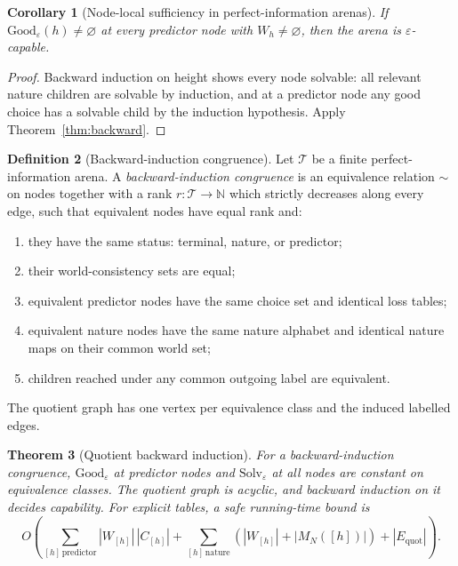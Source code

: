 \documentclass[11pt]{article}
\theoremstyle{plain}
\newtheorem{theorem}{Theorem}[section]
\newtheorem{corollary}[theorem]{Corollary}
\theoremstyle{definition}
\newtheorem{definition}[theorem]{Definition}
\theoremstyle{remark}
\newcommand{\N}{\mathbb{N}}
\newcommand{\eps}{\varepsilon}
\begin{document}
\begin{corollary}[Node-local sufficiency in perfect-information arenas]
\label{cor:no-perfect-D}
If $\mathrm{Good}_\eps(h)\ne\varnothing$ at every predictor node with
$W_h\ne\varnothing$, then the arena is $\eps$-capable.
\end{corollary}

\begin{proof}
Backward induction on height shows every node solvable: all relevant nature
children are solvable by induction, and at a predictor node any good choice has
a solvable child by the induction hypothesis. Apply
Theorem~\ref{thm:backward}.
\end{proof}
\begin{definition}[Backward-induction congruence]
\label{def:record-congruence}
Let $\mathcal T$ be a finite perfect-information arena. A
\emph{backward-induction congruence} is an equivalence relation $\sim$ on nodes
together with a rank $r:\mathcal T\to\N$ which strictly decreases along every
edge, such that equivalent nodes have equal rank and:
\begin{enumerate}[label=(\roman*)]
\item they have the same status: terminal, nature, or predictor;
\item their world-consistency sets are equal;
\item equivalent predictor nodes have the same choice set and identical loss
tables;
\item equivalent nature nodes have the same nature alphabet and identical
nature maps on their common world set;
\item children reached under any common outgoing label are equivalent.
\end{enumerate}
The quotient graph has one vertex per equivalence class and the induced labelled
edges.
\end{definition}

\begin{theorem}[Quotient backward induction]
\label{thm:record-quotient-bi}
For a backward-induction congruence, $\mathrm{Good}_\eps$ at predictor nodes and
$\mathrm{Solv}_\eps$ at all nodes are constant on equivalence classes. The
quotient graph is acyclic, and backward induction on it decides capability. For
explicit tables, a safe running-time bound is
\[
O\!\left(
\sum_{[h]\,\mathrm{predictor}}|W_{[h]}|\,|C_{[h]}|
+\sum_{[h]\,\mathrm{nature}}
(|W_{[h]}|+|M_N([h])|)
+|E_{\mathrm{quot}}|
\right).
\]
\end{theorem}
\end{document}
